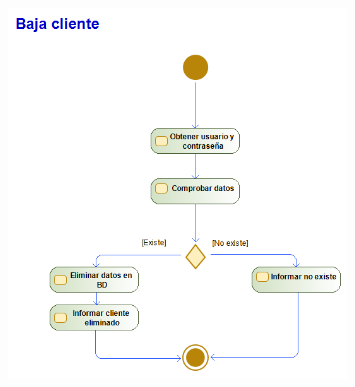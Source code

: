 \begin{figure}[H]
	\centering
	\includegraphics[width=0.8\textwidth]{Use_Cases/baja_cliente.png}
\end{figure}
\newpage
